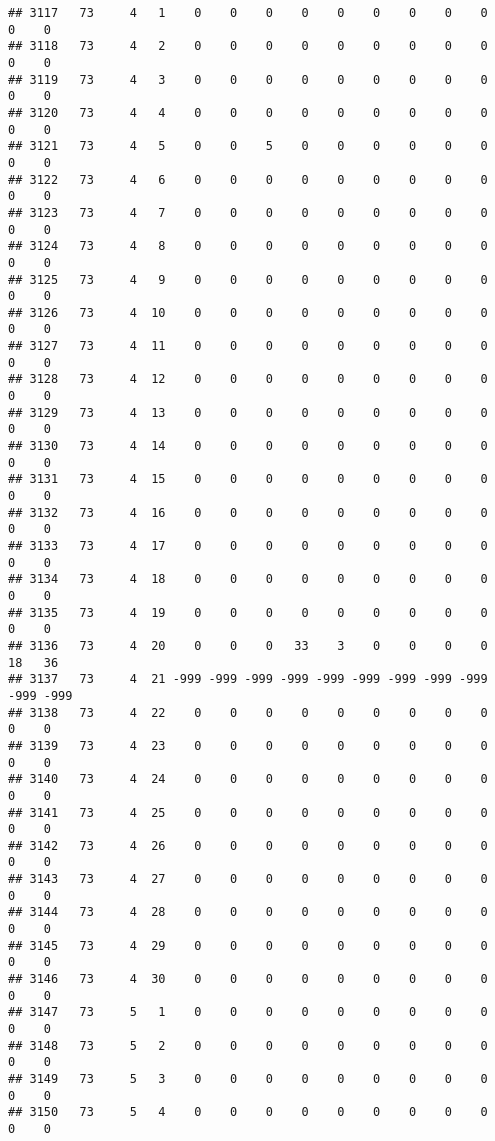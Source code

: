\documentclass[]{article}
\begin{document}
\begin{verbatim}
## 3117   73     4   1    0    0    0    0    0    0    0    0    0    0    0
## 3118   73     4   2    0    0    0    0    0    0    0    0    0    0    0
## 3119   73     4   3    0    0    0    0    0    0    0    0    0    0    0
## 3120   73     4   4    0    0    0    0    0    0    0    0    0    0    0
## 3121   73     4   5    0    0    5    0    0    0    0    0    0    0    0
## 3122   73     4   6    0    0    0    0    0    0    0    0    0    0    0
## 3123   73     4   7    0    0    0    0    0    0    0    0    0    0    0
## 3124   73     4   8    0    0    0    0    0    0    0    0    0    0    0
## 3125   73     4   9    0    0    0    0    0    0    0    0    0    0    0
## 3126   73     4  10    0    0    0    0    0    0    0    0    0    0    0
## 3127   73     4  11    0    0    0    0    0    0    0    0    0    0    0
## 3128   73     4  12    0    0    0    0    0    0    0    0    0    0    0
## 3129   73     4  13    0    0    0    0    0    0    0    0    0    0    0
## 3130   73     4  14    0    0    0    0    0    0    0    0    0    0    0
## 3131   73     4  15    0    0    0    0    0    0    0    0    0    0    0
## 3132   73     4  16    0    0    0    0    0    0    0    0    0    0    0
## 3133   73     4  17    0    0    0    0    0    0    0    0    0    0    0
## 3134   73     4  18    0    0    0    0    0    0    0    0    0    0    0
## 3135   73     4  19    0    0    0    0    0    0    0    0    0    0    0
## 3136   73     4  20    0    0    0   33    3    0    0    0    0   18   36
## 3137   73     4  21 -999 -999 -999 -999 -999 -999 -999 -999 -999 -999 -999
## 3138   73     4  22    0    0    0    0    0    0    0    0    0    0    0
## 3139   73     4  23    0    0    0    0    0    0    0    0    0    0    0
## 3140   73     4  24    0    0    0    0    0    0    0    0    0    0    0
## 3141   73     4  25    0    0    0    0    0    0    0    0    0    0    0
## 3142   73     4  26    0    0    0    0    0    0    0    0    0    0    0
## 3143   73     4  27    0    0    0    0    0    0    0    0    0    0    0
## 3144   73     4  28    0    0    0    0    0    0    0    0    0    0    0
## 3145   73     4  29    0    0    0    0    0    0    0    0    0    0    0
## 3146   73     4  30    0    0    0    0    0    0    0    0    0    0    0
## 3147   73     5   1    0    0    0    0    0    0    0    0    0    0    0
## 3148   73     5   2    0    0    0    0    0    0    0    0    0    0    0
## 3149   73     5   3    0    0    0    0    0    0    0    0    0    0    0
## 3150   73     5   4    0    0    0    0    0    0    0    0    0    0    0

\end{verbatim}
\end{document}
